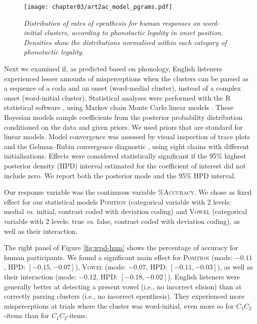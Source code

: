 {\begin{figure}[htb!]
  \centering
    \texttt{[image: chapter03/art2ac\_model\_pgrams.pdf]}    \caption{\textit{Distribution of rates of epenthesis for human responses on word-initial clusters, according to phonotactic legality in onset position. Densities show the distributions normalised within each category of phonotactic legality.}}
    \label{fig:wpd-legal}
  \end{figure}

  Next we examined if, as predicted based on phonology, English listeners experienced lesser amounts of misperceptions when the clusters can be parsed as a sequence of a coda and an onset (word-medial cluster), instead of a complex onset (word-initial cluster). 
Statistical analyses were performed with the R statistical software \cite{R-base}, using Markov chain Monte Carlo linear models \cite{R-MCMCglmm, R-coda}. These Bayesian models sample coefficients from the posterior probability distribution conditioned on the data and given priors. We used priors that are standard for linear models. Model convergence was assessed by visual inspection of trace plots and the Gelman–Rubin convergence diagnostic \cite{gelman1992}, using eight chains with different initialisations. Effects were considered statistically significant if the 95\% highest posterior density (HPD) interval estimated for the coefficient of interest did not include zero. We report both the posterior mode and the 95\% HPD interval.  

Our response variable was the continuous variable \textsc{\%Accuracy}.
We chose as fixed effect for our statistical models \textsc{Position} (categorical variable with 2 levels: medial \textit{vs.} initial, contrast coded with deviation coding) and \textsc{Vowel} (categorical variable with 2 levels: true \textit{vs.} false, contrast coded with deviation coding), as well as their interaction.

The right panel of Figure \ref{fig:wpd-hum} shows the percentage of accuracy for human participants. We found a significant main effect for \textsc{Position} (mode: $-0.11$, HPD: $[-0.15, -0.07]$), \textsc{Vowel} (mode: $-0.07$, HPD: $[-0.11, -0.03]$), as well as their interaction (mode: $-0.12$, HPD: $[-0.18, -0.02]$). English listeners were generally better at detecting a present vowel (i.e., no incorrect elision) than at correctly parsing clusters (i.e., no incorrect epenthesis). They experienced more misperceptions at trials where the cluster was word-initial, even more so for $C_{1}C_{2}$-items than for $C_{1}$\textipa{[@]}$C_{2}$-items. %

}
